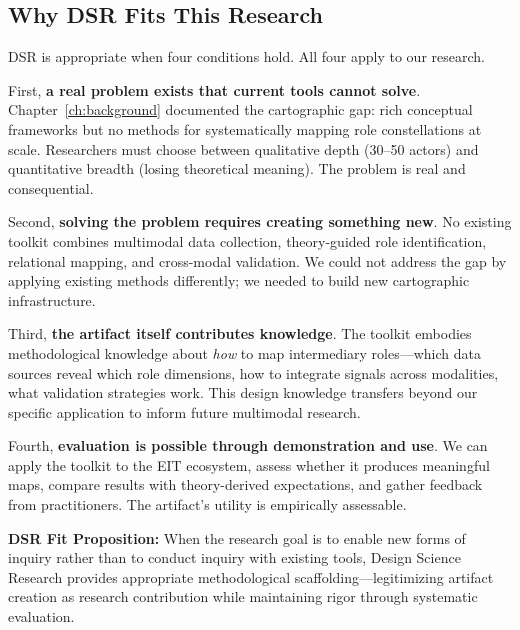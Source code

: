 \documentclass[../main.tex]{subfiles}
\begin{document}
\subsection{Why DSR Fits This Research}

DSR is appropriate when four conditions hold. All four apply to our research.

First, \textbf{a real problem exists that current tools cannot solve}. Chapter~\ref{ch:background} documented the cartographic gap: rich conceptual frameworks but no methods for systematically mapping role constellations at scale. Researchers must choose between qualitative depth (30--50 actors) and quantitative breadth (losing theoretical meaning). The problem is real and consequential.

Second, \textbf{solving the problem requires creating something new}. No existing toolkit combines multimodal data collection, theory-guided role identification, relational mapping, and cross-modal validation. We could not address the gap by applying existing methods differently; we needed to build new cartographic infrastructure.

Third, \textbf{the artifact itself contributes knowledge}. The \RoleBox toolkit embodies methodological knowledge about \emph{how} to map intermediary roles---which data sources reveal which role dimensions, how to integrate signals across modalities, what validation strategies work. This design knowledge transfers beyond our specific application to inform future multimodal research.

Fourth, \textbf{evaluation is possible through demonstration and use}. We can apply the toolkit to the EIT ecosystem, assess whether it produces meaningful maps, compare results with theory-derived expectations, and gather feedback from practitioners. The artifact's utility is empirically assessable.

\begin{propositionbox}
\textbf{DSR Fit Proposition:} When the research goal is to enable new forms of inquiry rather than to conduct inquiry with existing tools, Design Science Research provides appropriate methodological scaffolding---legitimizing artifact creation as research contribution while maintaining rigor through systematic evaluation.
\end{propositionbox}
\end{document}
